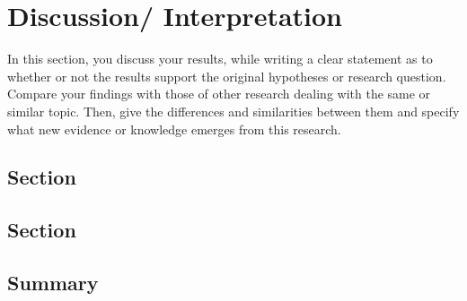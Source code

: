 \chapter {Discussion/ Interpretation}
\label{label14}

In this section, you discuss your results, while writing a clear statement as to whether or not the results support the original hypotheses or research question. Compare your findings with those of other research dealing with the same or similar topic. Then, give the differences and similarities between them and specify what new evidence or knowledge emerges from this research.    


\section{Section}
\label{label15}
       

\section{Section}
\label{label16}


 

\section{Summary}
\label{label17}